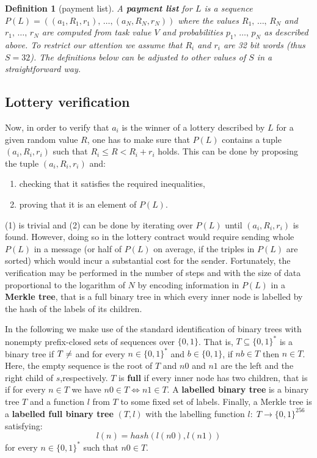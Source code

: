 \documentclass[a4paper]{article}
\newtheorem*{dfnt}{Definition}
\begin{document}
    \begin{dfnt}[payment list]
        A \textbf{payment list} for $L$ is a sequence $P(L) = ((a_1, R_1, r_1), \,\ldots, (a_N, R_N, r_N))$ where the values
        $R_1,\,\ldots,\, R_N$ and $r_1,\,\ldots,\, r_N$ are computed from task value $V$ and probabilities
        $p_1,\,\ldots,\,p_N$ as described above. To restrict our attention we assume that $R_i$ and $r_i$ are 32 bit
        words (thus $S = 32$). The definitions below can be adjusted to other values of $S$ in a straightforward way.
    \end{dfnt}

\subsection{Lottery verification}
    \label{sec:lottery-verification}
    Now, in order to verify that $a_i$ is the winner of a lottery described by $L$ for a given random value $R$,
    one has to make sure that $P(L)$ contains a tuple $(a_i, R_i, r_i)$ such that $R_i \leq R < R_i + r_i$ holds.
    This can be done by proposing the tuple $(a_i, R_i, r_i)$ and:
    \begin{enumerate}
        \item checking that it satisfies the required inequalities,
        \item proving that it is an element of $P(L)$.
    \end{enumerate}

    (1) is trivial and (2) can be done by iterating over $P(L)$ until $(a_i, R_i, r_i)$ is found. However,
    doing so in the lottery contract would require sending whole $P(L)$ in a message (or half of $P(L)$ on average,
    if the triples in $P(L)$ are sorted) which would incur a substantial cost for the sender. Fortunately,
    the verification may be performed in the number of steps and with the size of data proportional to the logarithm
    of $N$ by encoding information in $P(L)$ in a \textbf{Merkle tree}, that is a full binary tree in which every inner node
    is labelled by the hash of the labels of its children.

    In the following we make use of the standard identification of binary trees with nonempty prefix-closed sets
    of sequences over $\{0,1\}$. That is, $T \subseteq \{0,1\}^*$ is a binary tree if $T \neq \empty$ and for every
    $n \in \{0,1\}^*$ and $b \in \{0,1\}$, if $nb \in T$ then $n \in T$. Here, the empty sequence is the
    root of $T$ and $n0$ and $n1$ are the left and the right child of $s$,respectively.
    $T$ is \textbf{full} if every inner node has two children, that is if for every $n \in T$ we have $n0 \in T \iff n1 \in T$.
    A \textbf{labelled binary tree} is a binary tree $T$ and a function $l$ from $T$ to some fixed set of labels.
    Finally, a Merkle tree is a \textbf{labelled full binary tree} $(T, l)$ with the labelling function
    $l:\; T \rightarrow \{0,1\}^{256}$ satisfying:
    \begin{displaymath}
        l(n) = hash(l(n0), l(n1))
    \end{displaymath}
    for every $n \in \{0,1\}^*$ such that $n0 \in T$.
\end{document}
